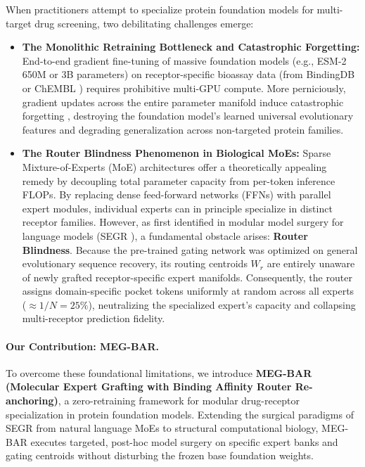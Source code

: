 \documentclass{article}
\theoremstyle{definition}
\begin{document}
When practitioners attempt to specialize protein foundation models for multi-target drug screening, two debilitating challenges emerge:
\begin{itemize}[leftmargin=1.5em]
    \item \textbf{The Monolithic Retraining Bottleneck and Catastrophic Forgetting:} End-to-end gradient fine-tuning of massive foundation models (e.g., ESM-2 650M or 3B parameters) on receptor-specific bioassay data (from BindingDB \citep{gilson2016bindingdb} or ChEMBL \citep{mendez2019chembl}) requires prohibitive multi-GPU compute. More perniciously, gradient updates across the entire parameter manifold induce catastrophic forgetting \citep{kirkpatrick2017overcoming}, destroying the foundation model's learned universal evolutionary features and degrading generalization across non-targeted protein families.
    \item \textbf{The Router Blindness Phenomenon in Biological MoEs:} Sparse Mixture-of-Experts (MoE) architectures \citep{shazeer2017outrageously,fedus2022switch,lepikhin2021gshard} offer a theoretically appealing remedy by decoupling total parameter capacity from per-token inference FLOPs. By replacing dense feed-forward networks (FFNs) with parallel expert modules, individual experts can in principle specialize in distinct receptor families. However, as first identified in modular model surgery for language models (SEGR \citep{rahim2026segr}), a fundamental obstacle arises: \textbf{Router Blindness}. Because the pre-trained gating network was optimized on general evolutionary sequence recovery, its routing centroids $W_r$ are entirely unaware of newly grafted receptor-specific expert manifolds. Consequently, the router assigns domain-specific pocket tokens uniformly at random across all experts ($\approx 1/N = 25\%$), neutralizing the specialized expert's capacity and collapsing multi-receptor prediction fidelity.
\end{itemize}

\paragraph{Our Contribution: MEG-BAR.}
To overcome these foundational limitations, we introduce \textbf{MEG-BAR (Molecular Expert Grafting with Binding Affinity Router Re-anchoring)}, a zero-retraining framework for modular drug-receptor specialization in protein foundation models. Extending the surgical paradigms of SEGR \citep{rahim2026segr} from natural language MoEs to structural computational biology, MEG-BAR executes targeted, post-hoc model surgery on specific expert banks and gating centroids without disturbing the frozen base foundation weights.
\end{document}
